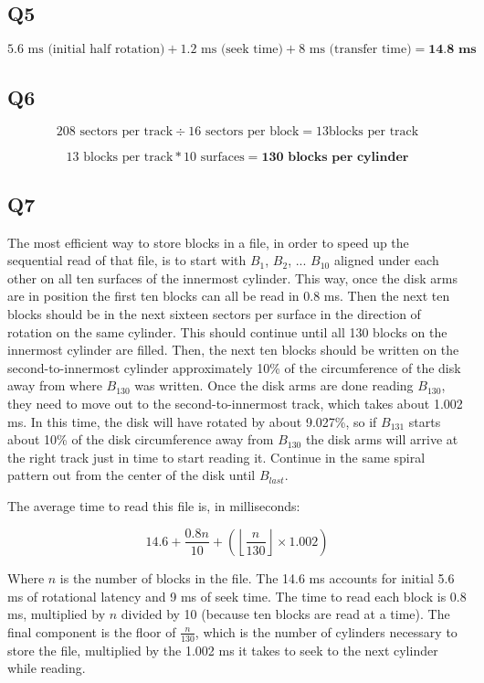 \documentclass[a4paper, 12pt]{article}
\begin{document}
\subsection*{Q5}

\[ 5.6 \text{ ms (initial half rotation)} + 1.2 \text{ ms (seek time)} + 8
		\text{ ms (transfer time)} = \textbf{14.8 ms} \]

\subsection*{Q6}

\[ 208 \text{ sectors per track} \div 16 \text{ sectors per block} = 13 \text{
				blocks per track} \]

\[ 13 \text{ blocks per track} * 10 \text{ surfaces} = \textbf{130 blocks per
				cylinder} \]

\subsection*{Q7}

The most efficient way to store blocks in a file, in order to speed up the
sequential read of that file, is to start with $B_1$, $B_2$, ... $B_{10}$
aligned under each other on all ten surfaces of the innermost cylinder. This
way, once the disk arms are in position the first ten blocks can all be read in
0.8 ms. Then the next ten blocks should be in the next sixteen sectors per
surface in the direction of rotation on the same cylinder. This should continue
until all 130 blocks on the innermost cylinder are filled. Then, the next ten
blocks should be written on the second-to-innermost cylinder approximately 10\%
of the circumference of the disk away from where $B_{130}$ was written. Once the
disk arms are done reading $B_{130}$, they need to move out to the
second-to-innermost track, which takes about 1.002 ms. In this time, the disk
will have rotated by about 9.027\%, so if $B_{131}$ starts about 10\% of the
disk circumference away from $B_{130}$ the disk arms will arrive at the right
track just in time to start reading it.  Continue in the same spiral pattern out
from the center of the disk until $B_{last}$.

The average time to read this file is, in milliseconds:

\[ 14.6 + \frac{0.8 n}{10} + \left ( \left \lfloor{\frac{n}{130}}\right \rfloor
				\times 1.002 \right ) \]

Where $n$ is the number of blocks in the file. The 14.6 ms accounts for initial
5.6 ms of rotational latency and 9 ms of seek time. The time to read each block
is 0.8 ms, multiplied by $n$ divided by 10 (because ten blocks are read at a
time). The final component is the floor of $ \frac{n}{130} $, which is the
number of cylinders necessary to store the file, multiplied by the 1.002 ms it
takes to seek to the next cylinder while reading.
\end{document}
